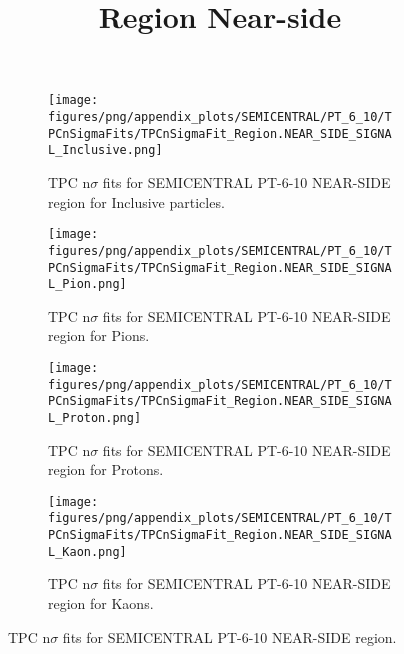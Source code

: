             \begin{figure}[H]
                \title{Region Near-side}
                \begin{subfigure}[b]{0.5\textwidth}
                    \centering
                    \texttt{[image: figures/png/appendix\_plots/SEMICENTRAL/PT\_6\_10/TPCnSigmaFits/TPCnSigmaFit\_Region.NEAR\_SIDE\_SIGNAL\_Inclusive.png]}
                    \caption{TPC n$\sigma$ fits for SEMICENTRAL PT-6-10 NEAR-SIDE region for Inclusive particles.}
                    \label{fig:appendix_SEMICENTRAL_PT-6-10_NEAR_SIDE_SIGNAL_Inclusive}
                \end{subfigure}
                \begin{subfigure}[b]{0.5\textwidth}
                    \centering
                    \texttt{[image: figures/png/appendix\_plots/SEMICENTRAL/PT\_6\_10/TPCnSigmaFits/TPCnSigmaFit\_Region.NEAR\_SIDE\_SIGNAL\_Pion.png]}
                    \caption{TPC n$\sigma$ fits for SEMICENTRAL PT-6-10 NEAR-SIDE region for Pions.}
                    \label{fig:appendix_SEMICENTRAL_PT-6-10_NEAR_SIDE_SIGNAL_Pion}
                \end{subfigure}
                \begin{subfigure}[b]{0.5\textwidth}
                    \centering
                    \texttt{[image: figures/png/appendix\_plots/SEMICENTRAL/PT\_6\_10/TPCnSigmaFits/TPCnSigmaFit\_Region.NEAR\_SIDE\_SIGNAL\_Proton.png]}
                    \caption{TPC n$\sigma$ fits for SEMICENTRAL PT-6-10 NEAR-SIDE region for Protons.}
                    \label{fig:appendix_SEMICENTRAL_PT-6-10_NEAR_SIDE_SIGNAL_Proton}
                \end{subfigure}
                \begin{subfigure}[b]{0.5\textwidth}
                    \centering
                    \texttt{[image: figures/png/appendix\_plots/SEMICENTRAL/PT\_6\_10/TPCnSigmaFits/TPCnSigmaFit\_Region.NEAR\_SIDE\_SIGNAL\_Kaon.png]}
                    \caption{TPC n$\sigma$ fits for SEMICENTRAL PT-6-10 NEAR-SIDE region for Kaons.}
                    \label{fig:appendix_SEMICENTRAL_PT-6-10_NEAR_SIDE_SIGNAL_Kaon}
                \end{subfigure}
                \caption{TPC n$\sigma$ fits for SEMICENTRAL PT-6-10 NEAR-SIDE region.}
                \label{fig:appendix_SEMICENTRAL_PT-6-10_NEAR_SIDE_SIGNAL}
            \end{figure}
